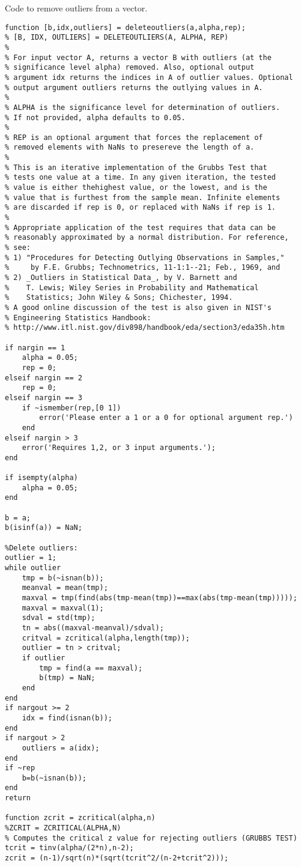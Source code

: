 \clearpage

Code to remove outliers from a vector.

\begin{verbatim}
function [b,idx,outliers] = deleteoutliers(a,alpha,rep);
% [B, IDX, OUTLIERS] = DELETEOUTLIERS(A, ALPHA, REP)
% 
% For input vector A, returns a vector B with outliers (at the
% significance level alpha) removed. Also, optional output 
% argument idx returns the indices in A of outlier values. Optional
% output argument outliers returns the outlying values in A.
%
% ALPHA is the significance level for determination of outliers.
% If not provided, alpha defaults to 0.05.
% 
% REP is an optional argument that forces the replacement of
% removed elements with NaNs to presereve the length of a.
%
% This is an iterative implementation of the Grubbs Test that
% tests one value at a time. In any given iteration, the tested 
% value is either thehighest value, or the lowest, and is the
% value that is furthest from the sample mean. Infinite elements
% are discarded if rep is 0, or replaced with NaNs if rep is 1.
% 
% Appropriate application of the test requires that data can be
% reasonably approximated by a normal distribution. For reference,
% see:
% 1) "Procedures for Detecting Outlying Observations in Samples,"
%     by F.E. Grubbs; Technometrics, 11-1:1--21; Feb., 1969, and 
% 2) _Outliers in Statistical Data_, by V. Barnett and
%    T. Lewis; Wiley Series in Probability and Mathematical
%    Statistics; John Wiley & Sons; Chichester, 1994.
% A good online discussion of the test is also given in NIST's
% Engineering Statistics Handbook:
% http://www.itl.nist.gov/div898/handbook/eda/section3/eda35h.htm

if nargin == 1
	alpha = 0.05;
	rep = 0;
elseif nargin == 2
	rep = 0;
elseif nargin == 3
	if ~ismember(rep,[0 1])
		error('Please enter a 1 or a 0 for optional argument rep.')
	end
elseif nargin > 3
	error('Requires 1,2, or 3 input arguments.');
end

if isempty(alpha)
	alpha = 0.05;
end

b = a;
b(isinf(a)) = NaN;

%Delete outliers:
outlier = 1;
while outlier
	tmp = b(~isnan(b));
	meanval = mean(tmp);
	maxval = tmp(find(abs(tmp-mean(tmp))==max(abs(tmp-mean(tmp)))));
	maxval = maxval(1);
	sdval = std(tmp);
	tn = abs((maxval-meanval)/sdval);
	critval = zcritical(alpha,length(tmp));
	outlier = tn > critval;
	if outlier
		tmp = find(a == maxval);
		b(tmp) = NaN;
	end
end
if nargout >= 2
	idx = find(isnan(b));
end
if nargout > 2
	outliers = a(idx);
end
if ~rep
	b=b(~isnan(b));
end
return

function zcrit = zcritical(alpha,n)
%ZCRIT = ZCRITICAL(ALPHA,N)
% Computes the critical z value for rejecting outliers (GRUBBS TEST)
tcrit = tinv(alpha/(2*n),n-2);
zcrit = (n-1)/sqrt(n)*(sqrt(tcrit^2/(n-2+tcrit^2)));
\end{verbatim}
\clearpage

